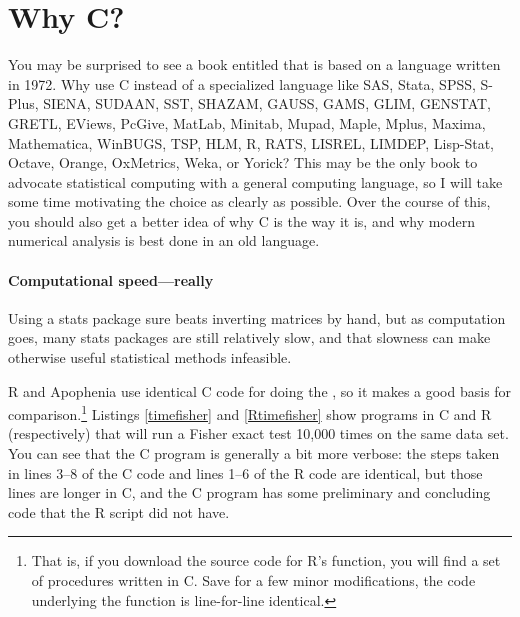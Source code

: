 \section{Why C?}
You may be surprised to see a book entitled  that is based on a language written in 1972. 
Why use C instead of a specialized language like SAS, Stata, SPSS,
S-Plus, SIENA, SUDAAN, SST, SHAZAM, GAUSS, GAMS, GLIM, GENSTAT, GRETL, EViews,
PcGive, MatLab, Minitab, Mupad, Maple, Mplus, Maxima, Mathematica, WinBUGS, TSP,
HLM, R, RATS, LISREL, LIMDEP, Lisp-Stat, Octave, Orange, OxMetrics, Weka, or Yorick?
This may be the only book to advocate statistical computing with
a general computing language, so I will take some time motivating the
choice as clearly as possible. Over the course of this, you should also
get a better idea of why C is the way it is, and why modern numerical
analysis is best done in an old language.

\paragraph{Computational speed---really} Using a stats package sure
beats inverting matrices by hand, but as computation goes, many stats
packages are still relatively slow, and that slowness can make otherwise
useful statistical methods infeasible.

\lstset{numbers=left, numberstyle=\scshape}

\lstset{numbers=none}

R and Apophenia use identical C code for doing the , so it makes a good basis for comparison.\footnote{That is,
if you download the source code for R's  function,
you will find a set of procedures written in C.  Save for a few minor
modifications, the code underlying the 
function is line-for-line identical.} Listings \ref{timefisher} and
\ref{Rtimefisher} show programs in C and R (respectively) that will run
a Fisher exact test 10,000 times on the same data set.  You can see that
the C program is generally a bit more verbose: the steps taken in lines
3--8 of the C code and lines 1--6 of the R code are identical, but those lines
are longer in C, and the C program has some preliminary and concluding
code that the R script did not have.

